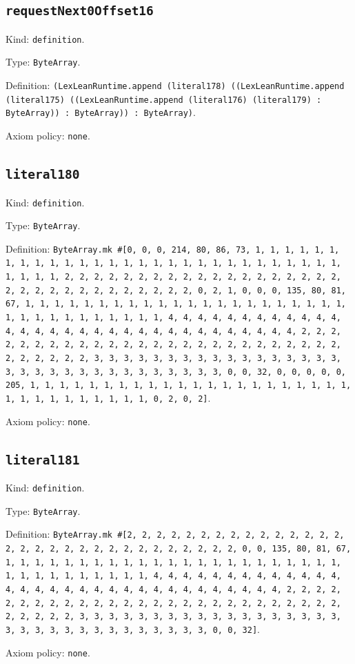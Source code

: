 \documentclass[11pt]{article}
\begin{document}
\subsection*{\texttt{requestNext0Offset16}}
\noindent Kind: \texttt{definition}.\par
\noindent Type: \texttt{ByteArray}.\par
\noindent Definition: \texttt{(LexLeanRuntime.append (literal178) ((LexLeanRuntime.append (literal175) ((LexLeanRuntime.append (literal176) (literal179) : ByteArray)) : ByteArray)) : ByteArray)}.\par
\noindent Axiom policy: \texttt{none}.\par
\subsection*{\texttt{literal180}}
\noindent Kind: \texttt{definition}.\par
\noindent Type: \texttt{ByteArray}.\par
\noindent Definition: \texttt{ByteArray.mk \#[0, 0, 0, 214, 80, 86, 73, 1, 1, 1, 1, 1, 1, 1, 1, 1, 1, 1, 1, 1, 1, 1, 1, 1, 1, 1, 1, 1, 1, 1, 1, 1, 1, 1, 1, 1, 1, 1, 1, 1, 2, 2, 2, 2, 2, 2, 2, 2, 2, 2, 2, 2, 2, 2, 2, 2, 2, 2, 2, 2, 2, 2, 2, 2, 2, 2, 2, 2, 2, 2, 2, 2, 0, 2, 1, 0, 0, 0, 135, 80, 81, 67, 1, 1, 1, 1, 1, 1, 1, 1, 1, 1, 1, 1, 1, 1, 1, 1, 1, 1, 1, 1, 1, 1, 1, 1, 1, 1, 1, 1, 1, 1, 1, 1, 1, 4, 4, 4, 4, 4, 4, 4, 4, 4, 4, 4, 4, 4, 4, 4, 4, 4, 4, 4, 4, 4, 4, 4, 4, 4, 4, 4, 4, 4, 4, 4, 4, 2, 2, 2, 2, 2, 2, 2, 2, 2, 2, 2, 2, 2, 2, 2, 2, 2, 2, 2, 2, 2, 2, 2, 2, 2, 2, 2, 2, 2, 2, 2, 2, 3, 3, 3, 3, 3, 3, 3, 3, 3, 3, 3, 3, 3, 3, 3, 3, 3, 3, 3, 3, 3, 3, 3, 3, 3, 3, 3, 3, 3, 3, 3, 3, 0, 0, 32, 0, 0, 0, 0, 0, 205, 1, 1, 1, 1, 1, 1, 1, 1, 1, 1, 1, 1, 1, 1, 1, 1, 1, 1, 1, 1, 1, 1, 1, 1, 1, 1, 1, 1, 1, 1, 1, 1, 0, 2, 0, 2]}.\par
\noindent Axiom policy: \texttt{none}.\par
\subsection*{\texttt{literal181}}
\noindent Kind: \texttt{definition}.\par
\noindent Type: \texttt{ByteArray}.\par
\noindent Definition: \texttt{ByteArray.mk \#[2, 2, 2, 2, 2, 2, 2, 2, 2, 2, 2, 2, 2, 2, 2, 2, 2, 2, 2, 2, 2, 2, 2, 2, 2, 2, 2, 2, 2, 2, 2, 0, 0, 135, 80, 81, 67, 1, 1, 1, 1, 1, 1, 1, 1, 1, 1, 1, 1, 1, 1, 1, 1, 1, 1, 1, 1, 1, 1, 1, 1, 1, 1, 1, 1, 1, 1, 1, 1, 1, 4, 4, 4, 4, 4, 4, 4, 4, 4, 4, 4, 4, 4, 4, 4, 4, 4, 4, 4, 4, 4, 4, 4, 4, 4, 4, 4, 4, 4, 4, 4, 4, 2, 2, 2, 2, 2, 2, 2, 2, 2, 2, 2, 2, 2, 2, 2, 2, 2, 2, 2, 2, 2, 2, 2, 2, 2, 2, 2, 2, 2, 2, 2, 2, 3, 3, 3, 3, 3, 3, 3, 3, 3, 3, 3, 3, 3, 3, 3, 3, 3, 3, 3, 3, 3, 3, 3, 3, 3, 3, 3, 3, 3, 3, 3, 3, 0, 0, 32]}.\par
\noindent Axiom policy: \texttt{none}.\par
\end{document}
